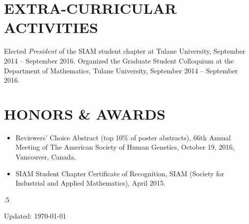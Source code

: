 \documentclass[margin]{res} %
\begin{document}
\begin{resume}

\section{EXTRA-CURRICULAR \\ ACTIVITIES}

Elected {\it President} of the SIAM student chapter at Tulane University, September 2014 -- September 2016.
Organized the Graduate Student Colloquium at the Department of Mathematics, Tulane University, September 2014 -- September 2016.


\section{HONORS \& AWARDS}

\begin{itemize}
  \item Reviewers’ Choice Abstract (top 10\% of poster abstracts), 66th Annual Meeting of The American Society of Human Genetics, October 19, 2016, Vancouver, Canada.
  \item SIAM Student Chapter Certificate of Recognition, SIAM (Society for Industrial and Applied Mathematics), April 2015.
\end{itemize}

\vfill
\moveleft.5\hoffset\centerline{Updated: \today}


\end{resume}
\end{document}
